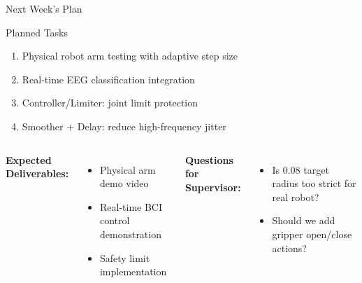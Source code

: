 \documentclass[aspectratio=169, 11pt]{beamer}
\begin{document}
\begin{frame}{Next Week's Plan}
    \begin{block}{Planned Tasks}
        \begin{enumerate}
            \item Physical robot arm testing with adaptive step size
            \item Real-time EEG classification integration
            \item Controller/Limiter: joint limit protection
            \item Smoother + Delay: reduce high-frequency jitter
        \end{enumerate}
    \end{block}
    
    \vspace{5mm}
    
    \begin{columns}[T]
        \textbf{Expected Deliverables:}
        \begin{itemize}
            \item Physical arm demo video
            \item Real-time BCI control demonstration
            \item Safety limit implementation
        \end{itemize}
        
        \textbf{Questions for Supervisor:}
        \begin{itemize}
            \item Is 0.08 target radius too strict for real robot?
            \item Should we add gripper open/close actions?
        \end{itemize}
    \end{columns}
\end{frame}
\end{document}
